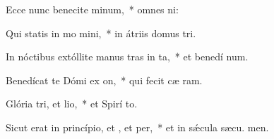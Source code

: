\item Ecce nunc benecite minum,~* omnes  ni:
\item Qui statis in mo mini,~* in átriis domus  tri.
\item In nóctibus extóllite manus tras in ta,~* et benedí num.
\item Benedícat te Dómi ex on,~* qui fecit cæ  ram.
\item Glória tri, et lio,~* et Spirí to.
\item Sicut erat in princípio, et , et per,~* et in sǽcula sæcu. men.
